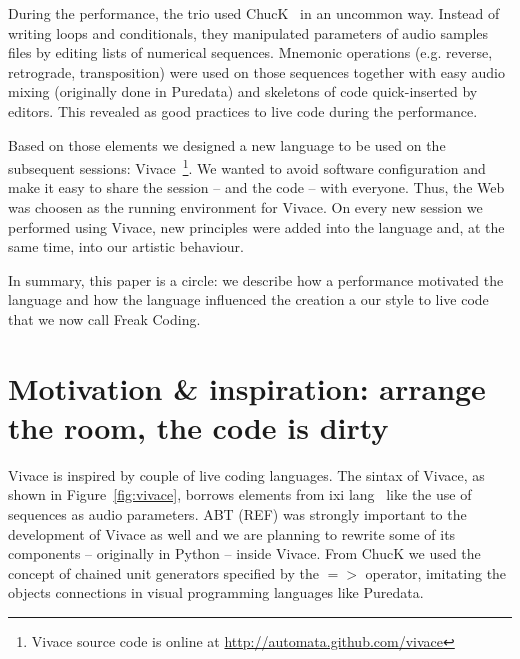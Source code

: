 \documentclass[letterpaper, 12pt]{article}
\begin{document}
During the performance, the trio used ChucK~\cite{wang2003chuck} in an
uncommon way. Instead of writing loops and conditionals, they
manipulated parameters of audio samples files by editing lists of
numerical sequences. Mnemonic operations (e.g. reverse, retrograde,
transposition) were used on those sequences together with easy audio
mixing (originally done in Puredata) and skeletons of
code quick-inserted by editors. This revealed as good practices to
live code during the performance.  

Based on those elements we designed a new language to be used on the
subsequent sessions: Vivace~\footnote{Vivace source code is online at
  \url{http://automata.github.com/vivace}}. We wanted to avoid
software configuration and make it easy to share the session -- and
the code -- with everyone. Thus, the Web was choosen as the running
environment for Vivace. On every new session we performed using
Vivace, new principles were added into the language and, at the same
time, into our artistic behaviour.  

In summary, this paper is a circle: we describe how a performance
motivated the language and how the language influenced the creation a
our style to live code that we now call Freak Coding.

%

\parskip 18pt

\section{Motivation \& inspiration: arrange the room, the code is dirty}

Vivace is inspired by couple of live coding languages. The sintax of Vivace, as shown in Figure~\ref{fig:vivace}, borrows elements from ixi lang~\cite{magnusson2011ixi} like the use of sequences as audio parameters. ABT (REF) was strongly important to the development of Vivace as well and we are planning to rewrite some of its components -- originally in Python -- inside Vivace. From ChucK we used the concept of chained unit generators specified by the $=>$ operator, imitating the objects connections in visual programming languages like Puredata.
\end{document}
